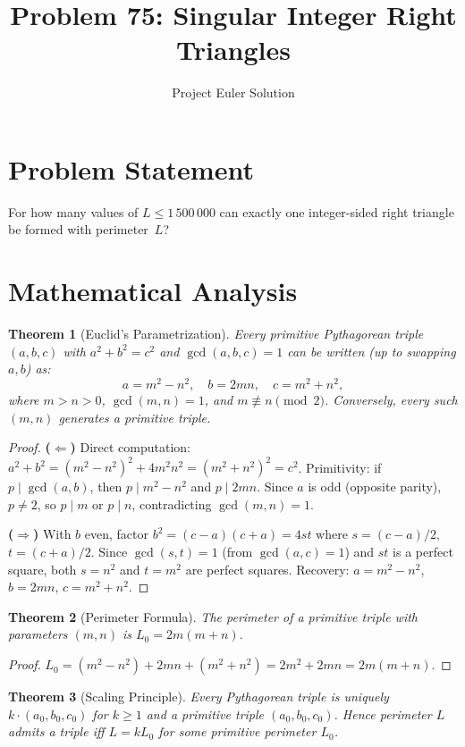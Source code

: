 \documentclass[12pt,a4paper]{article}
\title{Problem 75: Singular Integer Right Triangles}
\author{Project Euler Solution}
\date{}
\newtheorem{theorem}{Theorem}
\theoremstyle{definition}
\begin{document}
\maketitle

\section{Problem Statement}

For how many values of $L \le 1\,500\,000$ can exactly one integer-sided right triangle be formed with perimeter~$L$?

\section{Mathematical Analysis}

\begin{theorem}[Euclid's Parametrization]
Every primitive Pythagorean triple $(a, b, c)$ with $a^2 + b^2 = c^2$ and $\gcd(a,b,c) = 1$ can be written (up to swapping $a, b$) as:
\[
a = m^2 - n^2, \quad b = 2mn, \quad c = m^2 + n^2,
\]
where $m > n > 0$, $\gcd(m, n) = 1$, and $m \not\equiv n \pmod{2}$. Conversely, every such $(m,n)$ generates a primitive triple.
\end{theorem}

\begin{proof}
\textbf{($\Leftarrow$)} Direct computation: $a^2 + b^2 = (m^2-n^2)^2 + 4m^2n^2 = (m^2+n^2)^2 = c^2$. Primitivity: if $p \mid \gcd(a,b)$, then $p \mid m^2-n^2$ and $p \mid 2mn$. Since $a$ is odd (opposite parity), $p \neq 2$, so $p \mid m$ or $p \mid n$, contradicting $\gcd(m,n)=1$.

\textbf{($\Rightarrow$)} With $b$ even, factor $b^2 = (c-a)(c+a) = 4st$ where $s = (c-a)/2$, $t = (c+a)/2$. Since $\gcd(s,t) = 1$ (from $\gcd(a,c) = 1$) and $st$ is a perfect square, both $s = n^2$ and $t = m^2$ are perfect squares. Recovery: $a = m^2-n^2$, $b = 2mn$, $c = m^2+n^2$.
\end{proof}

\begin{theorem}[Perimeter Formula]
The perimeter of a primitive triple with parameters $(m,n)$ is $L_0 = 2m(m+n)$.
\end{theorem}

\begin{proof}
$L_0 = (m^2-n^2) + 2mn + (m^2+n^2) = 2m^2 + 2mn = 2m(m+n)$.
\end{proof}

\begin{theorem}[Scaling Principle]
Every Pythagorean triple is uniquely $k \cdot (a_0, b_0, c_0)$ for $k \geq 1$ and a primitive triple $(a_0, b_0, c_0)$. Hence perimeter $L$ admits a triple iff $L = kL_0$ for some primitive perimeter $L_0$.
\end{theorem}
\end{document}
